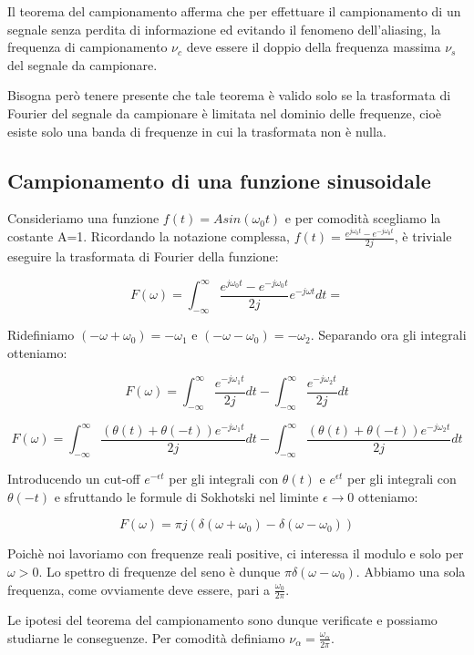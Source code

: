 Il teorema del campionamento afferma che per effettuare il campionamento di un segnale senza perdita di informazione ed evitando il fenomeno dell'aliasing, la frequenza di campionamento $\nu_c$ deve essere il doppio della frequenza massima $\nu_s$ del segnale da campionare.

Bisogna però tenere presente che tale teorema è valido solo se la trasformata di Fourier del segnale da campionare è limitata nel dominio delle frequenze, cioè esiste solo una banda di frequenze in cui la trasformata non è nulla.

\subsection{Campionamento di una funzione sinusoidale}

Consideriamo una funzione $f(t)=Asin(\omega_0 t)$ e per comodità scegliamo la costante A=1. Ricordando la notazione complessa, $f(t)=\frac{e^{j\omega_0 t}-e^{-j\omega_0 t}}{2j}$, è triviale eseguire la trasformata di Fourier della funzione:

$$F(\omega)=\int_{-\infty}^{\infty} \frac{e^{j\omega_0 t}-e^{-j\omega_0 t}}{2j}e^{-j\omega t} dt=$$

Ridefiniamo $(-\omega + \omega_0)=-\omega_1$ e $(-\omega - \omega_0)=-\omega_2$. Separando ora gli integrali otteniamo:

$$F(\omega)=\int_{-\infty}^{\infty} \frac{e^{-j\omega_1 t}}{2j}dt - \int_{-\infty}^{\infty} \frac{e^{-j\omega_2 t}}{2j}dt$$

$$F(\omega)=\int_{-\infty}^{\infty} \frac{(\theta(t)+\theta(-t)) e^{-j\omega_1 t}}{2j}dt - \int_{-\infty}^{\infty} \frac{(\theta(t)+\theta(-t))e^{-j\omega_2 t}}{2j}dt$$


Introducendo un cut-off $e^{-\epsilon t}$ per gli integrali con $\theta(t)$ e $e^{\epsilon t}$ per gli integrali con $\theta(-t)$ e sfruttando le formule di Sokhotski nel liminte $\epsilon \rightarrow 0$ otteniamo:

$$F(\omega)=\pi j (\delta(\omega + \omega_0) - \delta(\omega - \omega_0))$$

Poichè noi lavoriamo con frequenze reali positive, ci interessa il modulo e solo per $\omega > 0$. Lo spettro di frequenze del seno è dunque $\pi \delta(\omega-\omega_0)$. Abbiamo una sola frequenza, come ovviamente deve essere, pari a $\frac{\omega_0}{2\pi}$. 

Le ipotesi del teorema del campionamento sono dunque verificate e possiamo studiarne le conseguenze. Per comodità definiamo $\nu_{\alpha}=\frac{\omega_{\alpha}}{2\pi}$.

